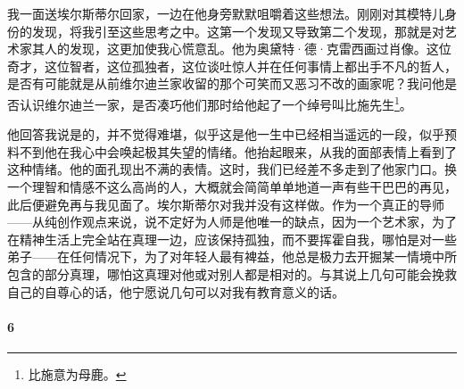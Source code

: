\par 我一面送埃尔斯蒂尔回家，一边在他身旁默默咀嚼着这些想法。刚刚对其模特儿身份的发现，将我引至这些思考之中。这第一个发现又导致第二个发现，那就是对艺术家其人的发现，这更加使我心慌意乱。他为奥黛特·德·克雷西画过肖像。这位奇才，这位智者，这位孤独者，这位谈吐惊人并在任何事情上都出手不凡的哲人，是否有可能就是从前维尔迪兰家收留的那个可笑而又恶习不改的画家呢？我问他是否认识维尔迪兰一家，是否凑巧他们那时给他起了一个绰号叫比施先生\footnote{比施意为母鹿。}。
\par 他回答我说是的，并不觉得难堪，似乎这是他一生中已经相当遥远的一段，似乎预料不到他在我心中会唤起极其失望的情绪。他抬起眼来，从我的面部表情上看到了这种情绪。他的面孔现出不满的表情。这时，我们已经差不多走到了他家门口。换一个理智和情感不这么高尚的人，大概就会简简单单地道一声有些干巴巴的再见，此后便避免再与我见面了。埃尔斯蒂尔对我并没有这样做。作为一个真正的导师——从纯创作观点来说，说不定好为人师是他唯一的缺点，因为一个艺术家，为了在精神生活上完全站在真理一边，应该保持孤独，而不要挥霍自我，哪怕是对一些弟子——在任何情况下，为了对年轻人最有裨益，他总是极力去开掘某一情境中所包含的部分真理，哪怕这真理对他或对别人都是相对的。与其说上几句可能会挽救自己的自尊心的话，他宁愿说几句可以对我有教育意义的话。



\paragraph*{6}

